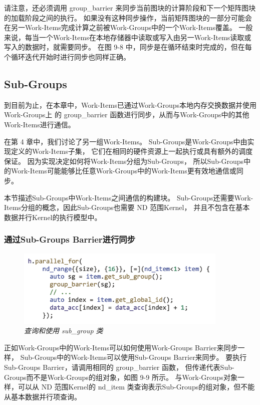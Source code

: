 请注意，还必须调用 group\_barrier 来同步当前图块的计算阶段和下一个矩阵图块的加载阶段之间的执行。 
如果没有这种同步操作，当前矩阵图块的一部分可能会在另一Work-Items完成计算之前被Work-Groups中的一个Work-Items覆盖。 
一般来说，每当一个Work-Items在本地存储器中读取或写入由另一Work-Items读取或写入的数据时，就需要同步。 
在图 9-8 中，同步是在循环结束时完成的，但在每个循环迭代开始时进行同步也同样正确。

\subsection{Sub-Groups}
到目前为止，在本章中，Work-Items已通过Work-Groups本地内存交换数据并使用Work-Groups上
的 group\_barrier 函数进行同步，从而与Work-Groups中的其他Work-Items进行通信。

在第 4 章中，我们讨论了另一组Work-Items。 Sub-Groups是Work-Groups中由实现定义的Work-Items子集，
它们在相同的硬件资源上一起执行或具有额外的调度保证。 
因为实现决定如何将Work-Items分组为Sub-Groups，
所以Sub-Groups中的Work-Items可能能够比任意Work-Groups中的Work-Items更有效地通信或同步。

本节描述Sub-Groups中Work-Items之间通信的构建块。 
Sub-Groups还需要Work-Items分组的概念，因此Sub-Groups也需要 ND 范围Kernel，
并且不包含在基本数据并行Kernel的执行模型中。

\subsubsection{通过Sub-Groups Barrier进行同步}

\begin{figure}[H]
	\centering
	\includegraphics[width=0.9\textwidth]{figs/F9.9.png}
	\caption{\textit{查询和使用 sub\_group 类 }}
\end{figure}

正如Work-Groups中的Work-Items可以如何使用Work-Groups Barrier来同步一样，
Sub-Groups中的Work-Items可以使用Sub-Groups Barrier来同步。 
要执行Sub-Groups Barrier，请调用相同的 group\_barrier 函数，
但传递代表Sub-Groups而不是Work-Groups的组对象，如图 9-9 所示。 
与Work-Groups对象一样，可以从 ND 范围Kernel的 nd\_item 类查询表示Sub-Groups的组对象，但不能从基本数据并行项查询。

